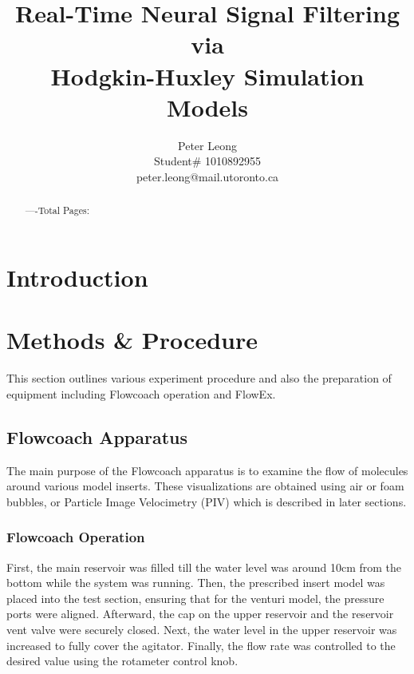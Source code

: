 \documentclass{article} %
\title{Real-Time Neural Signal Filtering via \\
Hodgkin-Huxley Simulation Models}
\author{
    Peter Leong \\
    Student\# 1010892955 \\
    peter.leong@mail.utoronto.ca \\
\AND
}
\begin{document}
\maketitle

\vspace{-6ex}

\begin{abstract}
----Total Pages: \pageref{last_page}
\end{abstract}

\vspace{2ex}

\begin{multicols}{2}

\section{Introduction}

\section{Methods \& Procedure}

This section outlines various experiment procedure and also the preparation of equipment including Flowcoach operation and FlowEx.

\subsection{Flowcoach Apparatus}

The main purpose of the Flowcoach apparatus is to examine the flow of molecules around various model inserts.
These visualizations are obtained using air or foam bubbles, or Particle Image Velocimetry (PIV) which is described in later sections.

\subsubsection{Flowcoach Operation}

First, the main reservoir was filled till the water level was around 10cm from the bottom while the system was running.
Then, the prescribed insert model was placed into the test section, ensuring that for the venturi model, the pressure ports were aligned.
Afterward, the cap on the upper reservoir and the reservoir vent valve were securely closed.
Next, the water level in the upper reservoir was increased to fully cover the agitator.
Finally, the flow rate was controlled to the desired value using the rotameter control knob.


\end{multicols}
\end{document}
